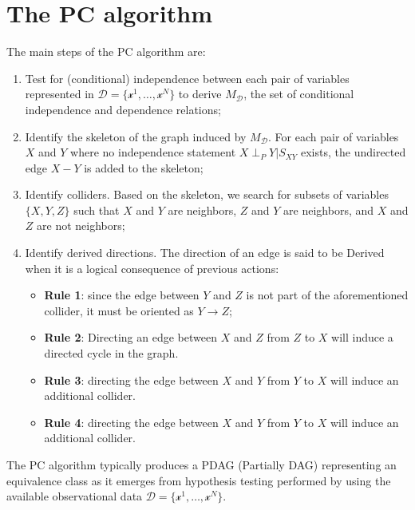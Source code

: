 \section{The PC algorithm}
The main steps of the PC algorithm are:
\begin{enumerate}
    \item Test for (conditional) independence between each pair of variables
          represented in $\mathcal{D} = \{\mathcal{x}^1, \dots, \mathcal{x}^N\}$
          to derive $M_\mathcal{D}$, the set of conditional independence and
          dependence relations;
    \item Identify the skeleton of the graph induced by $M_\mathcal{D}$. For each
          pair of variables $X$ and $Y$ where no independence statement $X \perp_{P} Y | S_{XY}$
          exists, the undirected edge $X - Y$ is added to the skeleton;
    \item Identify colliders. Based on the skeleton, we search for subsets of variables $\{X, Y, Z\}$
          such that $X$ and $Y$ are neighbors, $Z$ and $Y$ are neighbors, and
          $X$ and $Z$ are not neighbors;
    \item Identify derived directions. The direction of an edge is said to be
          Derived when it is a logical consequence of previous actions:
          \begin{itemize}
              \item \textbf{Rule 1}: since the edge between $Y$ and $Z$ is not part
                    of the aforementioned collider, it must be oriented as $Y \rightarrow Z$;
              \item \textbf{Rule 2}: Directing an edge between $X$ and $Z$ from $Z$
                    to $X$ will induce a directed cycle in the graph.
              \item \textbf{Rule 3}: directing the edge between $X$ and $Y$ from
                    $Y$ to $X$ will induce an additional collider.
              \item \textbf{Rule 4}: directing the edge between $X$ and $Y$ from
                    $Y$ to $X$ will induce an additional collider.
          \end{itemize}
\end{enumerate}

The PC algorithm typically produces a PDAG (Partially DAG) representing an equivalence
class as it emerges from hypothesis testing performed by using the available
observational data $\mathcal{D} = \{\mathcal{x}^1, \dots, \mathcal{x}^N\}$.

